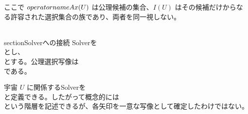 \documentclass[11pt,a4paper]{article}
\begin{document}
ここで $\\operatorname{Ax}(U)$ は公理候補の集合、$I(U)$ はその候補だけからなる許容された選択集合の族であり、両者を同一視しない。

\\section{Solverへの接続}
Solverを
\\[
s=(\\mathcal A_s,\\mathcal R_s)
\\]
とし、
\\[
\\Solver_I=\\{s=(\\mathcal A_s,\\mathcal R_s)\\mid\\mathcal A_s\\in I\\}
\\]
とする。公理選択写像は
\\[
\\mathfrak A:\\Solver_I\\to I,
\\qquad
\\mathfrak A(s)=\\mathcal A_s
\\]
である。

宇宙 $U$ に関係するSolverを
\\[
\\Solver(U)=\\{s\\in\\Solver_I\\mid\\mathcal A_s\\in I(U)\\}
\\]
と定義できる。したがって概念的には
\\[
U\\longrightarrow\\operatorname{Ax}(U)\\longrightarrow I(U)\\longrightarrow\\Solver(U)
\\]
という階層を記述できるが、各矢印を一意な写像として確定したわけではない。
\end{document}
